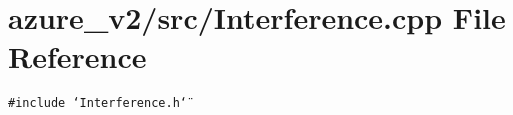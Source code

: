 \section{azure\_\-v2/src/Interference.cpp File Reference}
\label{Interference_8cpp}
{\tt \#include \char`\"{}Interference.h\char`\"{}}\par

